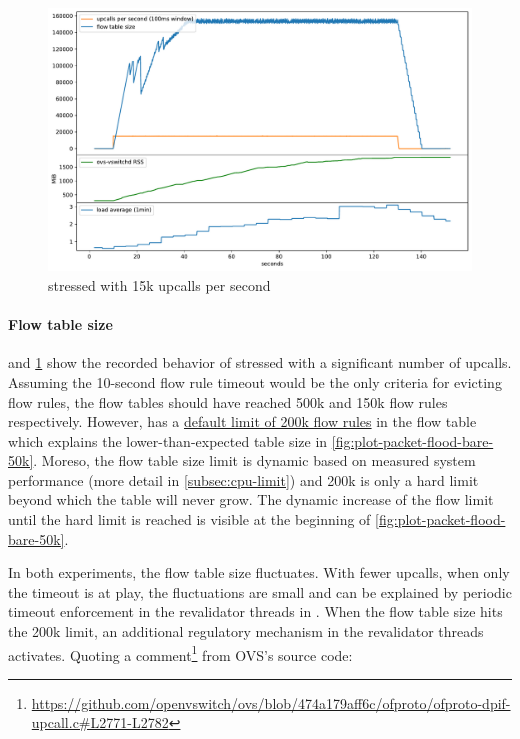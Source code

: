 \begin{figure}
    \centering
    \includegraphics[width=.9\linewidth]{img/packet_flood_bare_15k.pdf}
    \caption{ stressed with 15k upcalls per second}
    \label{fig:plot-packet-flood-bare-15k}
\end{figure}

\paragraph{Flow table size}
 and \cref{fig:plot-packet-flood-bare-15k} show the recorded behavior of  stressed with a significant number of upcalls. Assuming the 10-second flow rule timeout would be the only criteria for evicting flow rules, the flow tables should have reached 500k and 150k flow rules respectively. However,  has a \href{https://github.com/openvswitch/ovs/blob/859071224c590207ca5e1f8723ffdef72ef7b512/ofproto/ofproto.h\#L310}{default limit of 200k flow rules} in the flow table which explains the lower-than-expected table size in \cref{fig:plot-packet-flood-bare-50k}. Moreso, the flow table size limit is dynamic based on measured system performance (more detail in \cref{subsec:cpu-limit}) and 200k is only a hard limit beyond which the table will never grow. The dynamic increase of the flow limit until the hard limit is reached is visible at the beginning of \cref{fig:plot-packet-flood-bare-50k}.

In both experiments, the flow table size fluctuates. With fewer upcalls, when only the timeout is at play, the fluctuations are small and can be explained by periodic timeout enforcement in the revalidator threads in . When the flow table size hits the 200k limit, an additional regulatory mechanism in the revalidator threads activates. Quoting a comment\footnote{\url{https://github.com/openvswitch/ovs/blob/474a179aff6c/ofproto/ofproto-dpif-upcall.c\#L2771-L2782}} from OVS's source code:

